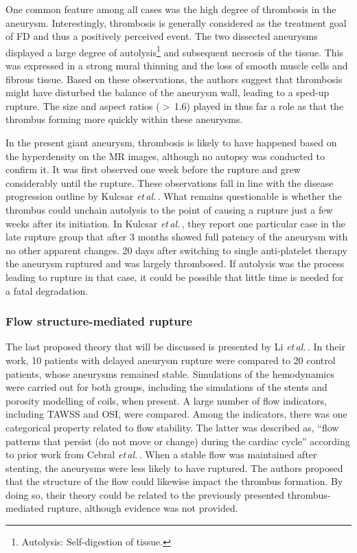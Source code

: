 One common feature among all cases was the high degree of thrombosis in the aneurysm. Interestingly, thrombosis is generally considered as the treatment goal of FD and thus a positively perceived event. The two dissected aneurysms displayed a large degree of autolysis\footnote{Autolysis: Self-digestion of tissue.} and subsequent necrosis of the tissue. This was expressed in a strong mural thinning and the loss of smooth muscle cells and fibrous tissue. Based on these observations, the authors suggest that thrombosis might have disturbed the balance of the aneurysm wall, leading to a sped-up rupture. The size and aspect ratios ($>$\,1.6) played in thus far a role as that the thrombus forming more quickly within these aneurysms.

In the present giant aneurysm, thrombosis is likely to have happened based on the hyperdensity on the MR images, although no autopsy was conducted to confirm it. It was first observed one week before the rupture and grew considerably until the rupture. These observations fall in line with the disease progression outline by Kulcsar \textit{et\,al.}\,\cite{Kulcsar2011}. What remains questionable is whether the thrombus could unchain autolysis to the point of causing a rupture just a few weeks after its initiation. In Kulcsar \textit{et\,al.}\,\cite{Kulcsar2011}, they report one particular case in the late rupture group that after 3 months showed full patency of the aneurysm with no other apparent changes. 20 days after switching to single anti-platelet therapy the aneurysm ruptured and was largely thrombosed. If autolysis was the process leading to rupture in that case, it could be possible that little time is needed for a fatal degradation.

\subsubsection*{Flow structure-mediated rupture}
The last proposed theory that will be discussed is presented by Li \textit{et\,al.}\,\cite{Li2019}. In their work, 10 patients with delayed aneurysm rupture were compared to 20 control patients, whose aneurysms remained stable. Simulations of the hemodynamics were carried out for both groups, including the simulations of the stents and porosity modelling of coils, when present. A large number of flow indicators, including TAWSS and OSI, were compared. Among the indicators, there was one categorical property related to flow stability. The latter was described as, ``flow patterns that persist (do not move or change) during the cardiac cycle'' according to prior work from Cebral \textit{et\,al.}\,\cite{Cebral_Mut_Weir_Putman_2010}. When a stable flow was maintained after stenting, the aneurysms were less likely to have ruptured. The authors proposed that the structure of the flow could likewise impact the thrombus formation. By doing so, their theory could be related to the previously presented thrombus-mediated rupture, although evidence was not provided.

